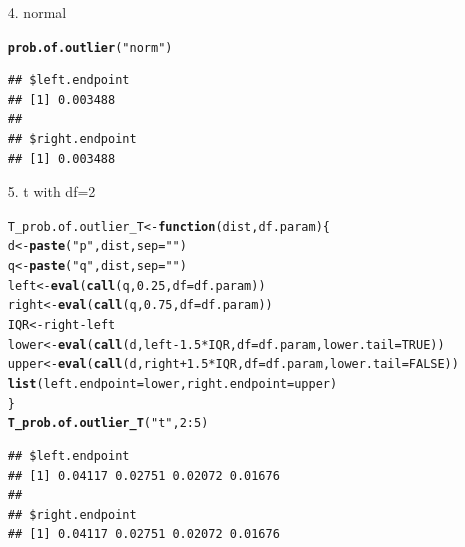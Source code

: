\documentclass{article}\usepackage{graphicx, color}
\makeatletter
\newcommand{\hlfunctioncall}[1]{\textcolor[rgb]{0.501960784313725,0,0.329411764705882}{\textbf{#1}}}%
\newcommand{\hlstring}[1]{\textcolor[rgb]{0.6,0.6,1}{#1}}%
\newenvironment{kframe}{%
 \def\at@end@of@kframe{}%
 \ifinner\ifhmode%
  \def\at@end@of@kframe{\end{minipage}}%
  \begin{minipage}{\columnwidth}%
 \fi\fi%
 \def\FrameCommand##1{\hskip\@totalleftmargin \hskip-\fboxsep
 \colorbox{shadecolor}{##1}\hskip-\fboxsep
     \hskip-\linewidth \hskip-\@totalleftmargin \hskip\columnwidth}%
 \MakeFramed {\advance\hsize-\width
   \@totalleftmargin\z@ \linewidth\hsize
   \@setminipage}}%
 {\par\unskip\endMakeFramed%
 \at@end@of@kframe}
\newenvironment{knitrout}{}{} %
\makeatother
\begin{document}
\begin{enumerate}
\begin{enumerate}
\begin{shaded}
\end{shaded}
\item[4.] normal
\begin{shaded}
\begin{knitrout}
\color{fgcolor}\begin{kframe}
\begin{alltt}
\hlfunctioncall{prob.of.outlier}(\hlstring{"norm"})
\end{alltt}
\begin{verbatim}
## $left.endpoint
## [1] 0.003488
## 
## $right.endpoint
## [1] 0.003488
\end{verbatim}
\end{kframe}
\end{knitrout}

\end{shaded}
\item[5.] t with df=2
\begin{shaded}
\begin{knitrout}
\color{fgcolor}\begin{kframe}
\begin{alltt}
T_prob.of.outlier_T <- \hlfunctioncall{function}(dist, df.param) \{
    d <- \hlfunctioncall{paste}(\hlstring{"p"}, dist, sep = \hlstring{""})
    q <- \hlfunctioncall{paste}(\hlstring{"q"}, dist, sep = \hlstring{""})
    left <- \hlfunctioncall{eval}(\hlfunctioncall{call}(q, 0.25, df = df.param))
    right <- \hlfunctioncall{eval}(\hlfunctioncall{call}(q, 0.75, df = df.param))
    IQR <- right - left
    lower <- \hlfunctioncall{eval}(\hlfunctioncall{call}(d, left - 1.5 * IQR, df = df.param, lower.tail = TRUE))
    upper <- \hlfunctioncall{eval}(\hlfunctioncall{call}(d, right + 1.5 * IQR, df = df.param, lower.tail = FALSE))
    \hlfunctioncall{list}(left.endpoint = lower, right.endpoint = upper)
\}
\hlfunctioncall{T_prob.of.outlier_T}(\hlstring{"t"}, 2:5)
\end{alltt}
\begin{verbatim}
## $left.endpoint
## [1] 0.04117 0.02751 0.02072 0.01676
## 
## $right.endpoint
## [1] 0.04117 0.02751 0.02072 0.01676
\end{verbatim}
\end{kframe}
\end{knitrout}



\end{shaded}
\end{enumerate}
\end{enumerate}
\end{document}
